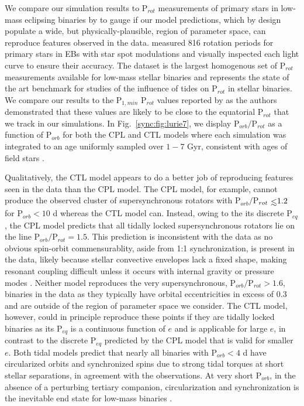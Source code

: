 We compare our simulation results to P$_{rot}$ measurements of primary stars in \kepler low-mass eclipsing binaries by \citet{Lurie2017} to gauge if our model predictions, which by design populate a wide, but physically-plausible, region of parameter space, can reproduce features observed in the data.  \citet{Lurie2017} measured 816 rotation periods for primary stars in \kepler EBs with star spot modulations and visually inspected each light curve to ensure their accuracy. The \citet{Lurie2017} dataset is the largest homogenous set of P$_{rot}$ measurements available for low-mass stellar binaries and represents the state of the art benchmark for studies of the influence of tides on P$_{rot}$ in stellar binaries. We compare our results to the P$_{1,min}$ P$_{rot}$ values reported by \citet{Lurie2017} as the authors demonstrated that these values are likely to be close to the equatorial P$_{rot}$ that we track in our simulations. In Fig.~\ref{sync:fig:lurie7}, we display P$_{orb}/$P$_{rot}$ as a function of P$_{orb}$ for both the CPL and CTL models where each simulation was integrated to an age uniformly sampled over $1-7$ Gyr, consistent with ages of \kepler field stars \citep{Chaplin2014}. 

Qualitatively, the CTL model appears to do a better job of reproducing features seen in the \citet{Lurie2017} data than the CPL model. The CPL model, for example, cannot produce the observed cluster of supersynchronous rotators with P$_{orb}/$P$_{rot} \lsim 1.2$ for P$_{orb} < 10$ d whereas the CTL model can. Instead, owing to the its discrete P$_{eq}$, the CPL model predicts that all tidally locked supersynchronous rotators lie on the line P$_{orb}/$P$_{rot} = 1.5$. This prediction is inconsistent with the data as no obvious spin-orbit commensurablity, aside from 1:1 synchronization, is present in the \citet{Lurie2017} data, likely because stellar convective envelopes lack a fixed shape, making resonant coupling difficult unless it occurs with internal gravity or pressure modes \citep{Burkart2014,Lurie2017}. Neither model reproduces the very supersynchronous, P$_{orb}/$P$_{rot} > 1.6$, binaries in the \citet{Lurie2017} data as they typically have orbital eccentricities in excess of 0.3 and are outside of the region of parameter space we consider. The CTL model, however, could in principle reproduce these points if they are tidally locked binaries as its P$_{eq}$ is a continuous function of $e$ and is applicable for large $e$, in contrast to the discrete P$_{eq}$ predicted by the CPL model that is valid for smaller $e$. Both tidal models predict that nearly all binaries with P$_{orb} < 4$ d have circularized orbits and synchronized spins due to strong tidal torques at short stellar separations, in agreement with the \citet{Lurie2017} observations. At very short P$_{orb}$, in the absence of a perturbing tertiary companion, circularization and synchronization is the inevitable end state for low-mass binaries \citep{Counselman1973}. 

